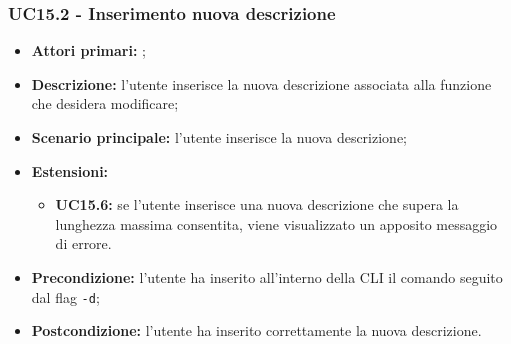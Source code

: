 \subsubsection{UC15.2 - Inserimento nuova descrizione}
\begin{itemize}
	\item \textbf{Attori primari:} \us{};
	\item \textbf{Descrizione:} l'utente inserisce la nuova descrizione associata alla funzione che desidera modificare;
	\item \textbf{Scenario principale:} l’utente inserisce la nuova descrizione;  
	\item \textbf{Estensioni:} 
	\begin{itemize}
		\item \textbf{UC15.6:} se l’utente inserisce una nuova descrizione che supera la lunghezza massima consentita, viene visualizzato un apposito messaggio di errore. 
	\end{itemize}
	\item \textbf{Precondizione:} l’utente ha inserito all’interno della CLI il comando \edit{} seguito dal flag \texttt{-d};
	\item \textbf{Postcondizione:} l’utente ha inserito correttamente la nuova descrizione.
\end{itemize}